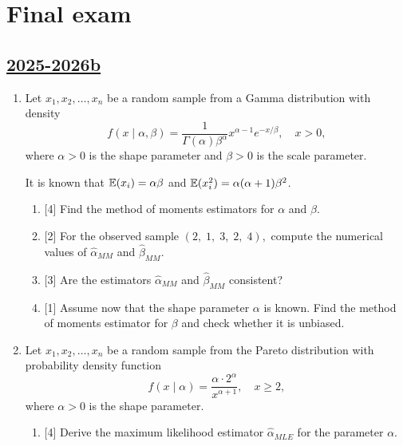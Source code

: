 


\newpage
\thispagestyle{empty}
\section{Final exam}

\subsection[2025-2026b]{\hyperref[sec:sol_kr_04_2025_2026b]{2025-2026b}}
\label{sec:kr_04_2025_2026b} %

\begin{enumerate}

\item Let \( x_1, x_2, \dots, x_n \) be a random sample from a Gamma distribution with density
\[
f(x \mid \alpha, \beta) = \frac{1}{\Gamma(\alpha)\beta^\alpha} x^{\alpha-1} e^{-x/\beta}, \quad x > 0,
\]
where \(\alpha > 0\) is the shape parameter and \(\beta > 0\) is the scale parameter.

It is known that
\(\operatorname{\mathbb{E}}(x_i) = \alpha\beta\) and \(\operatorname{\mathbb{E}} (x_i^2) = \alpha(\alpha+1)\beta^2\).
\begin{enumerate}
    \item {[4]} Find the method of moments estimators for \(\alpha\) and \(\beta\).
    \item {[2]} For the observed sample 
    \(
    (2,\; 1,\; 3,\; 2,\; 4),
    \)
    compute the numerical values of \(\hat{\alpha}_{MM}\) and \(\hat{\beta}_{MM}\).
    \item {[3]} Are the estimators \(\hat{\alpha}_{MM}\) and \(\hat{\beta}_{MM}\) consistent?
    \item {[1]} Assume now that the shape parameter \(\alpha\) is known. 
    Find the method of moments estimator for \(\beta\) and check whether it is unbiased.
\end{enumerate}

\item Let \(x_1, x_2, \dots, x_n\) be a random sample from the Pareto distribution with probability density function
\[
f(x \mid \alpha) = \frac{\alpha \cdot 2^\alpha}{x^{\alpha+1}}, \quad x \geq 2,
\]
where \(\alpha > 0\) is the shape parameter.

\begin{enumerate}
    \item {[4]} Derive the maximum likelihood estimator \(\hat{\alpha}_{MLE}\) for the parameter \(\alpha\).
    

\end{enumerate}
\end{enumerate}
